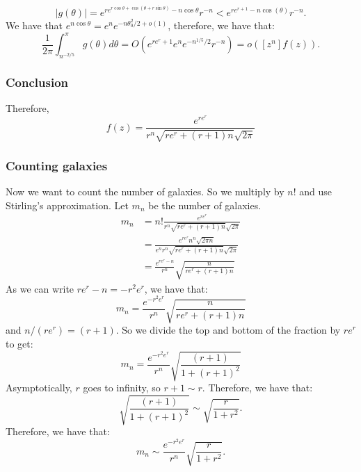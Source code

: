 \documentclass[]{article}
\theoremstyle{definition}
\numberwithin{theorem}{section}
\numberwithin{equation}{section}
\begin{document}
\begin{equation}
	|g(\theta)| = e^{r e^{r \cos \theta + \cos(\theta + r \sin \theta)} - n \cos \theta} r^{-n}< e^{r e^{r + 1} - n \cos(\theta)} r^{-n}. 
\end{equation}
We have that $e^{n \cos \theta} = e^n e^{- n \theta_0^2/2 + o(1)}$, therefore, we have that:
\begin{equation}
	\frac{1}{2 \pi} \int_{n^{-2/5}}^\pi g(\theta) d\theta = O(e^{r e^r + 1} e^{n} e^{-n^{1/5}/2} r^{-n} ) = o([z^n] f(z)).
\end{equation}

\subsubsection{Conclusion}
Therefore, 
\begin{equation}
	[z^n] f(z) = \frac{e^{r e^r}}{r^n \sqrt{r e^r + (r + 1)n} \sqrt{2\pi}}
\end{equation}

\subsubsection{Counting galaxies}

Now we want to count the number of galaxies. So we multiply by $n!$ and use Stirling's approximation. Let $m_n$ be the number of galaxies.
\begin{align*}
	m_n &= n!\frac{e^{r e^r}}{r^n \sqrt{r e^r + (r + 1)n} \sqrt{2\pi}}\\
	&= \frac{e^{r e^r} n^n \sqrt{2 \pi n}}{ e^n r^n \sqrt{r e^r + (r + 1)n} \sqrt{2\pi}}\\
	&= \frac{e^{r e^r - n}}{r^n} \sqrt{\frac{n}{r e^r + (r + 1)n }}
\end{align*}
As we can write $r e^r - n = - r^2 e^r$, we have that:
\begin{equation}
	m_n = \frac{e^{- r^2 e^r}}{r^n} \sqrt{\frac{n}{r e^r + (r + 1)n }}
\end{equation}
and $n/(r e^r) = (r + 1)$. So we divide the top and bottom of the fraction by $r e^r$ to get:
\begin{equation}
	m_n = \frac{e^{- r^2 e^r}}{r^n} \sqrt{\frac{(r + 1)}{1 + (r + 1)^2 }}
\end{equation}
Asymptotically, $r$ goes to infinity, so $r + 1 \sim r$. Therefore, we have that:
\begin{equation}
	\sqrt{\frac{(r + 1)}{1 + (r + 1)^2}} \sim \sqrt{\frac{r}{1 + r^2}}.
\end{equation}
Therefore, we have that:
\begin{equation}
	m_n \sim \frac{e^{- r^2 e^r}}{r^n} \sqrt{\frac{r}{1 + r^2}}.
\end{equation}
\end{document}

